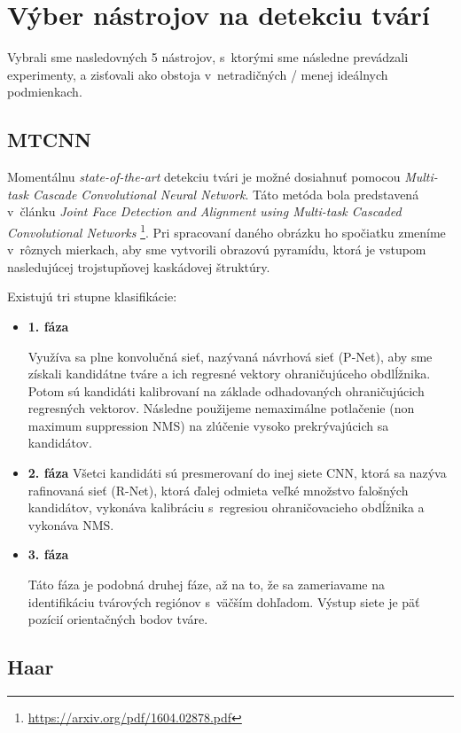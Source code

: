 \documentclass[]{article}
\begin{document}
	\section{Výber nástrojov na detekciu tvárí}
	
	Vybrali sme nasledovných 5 nástrojov, s~ktorými sme následne prevádzali experimenty, a zisťovali ako obstoja v~netradičných / menej ideálnych podmienkach.
	
	\subsection*{MTCNN}
	Momentálnu \textit{state-of-the-art} detekciu tvári je možné dosiahnuť pomocou \textit{Multi-task Cascade Convolutional Neural Network}. Táto metóda bola predstavená v~článku \textit{Joint Face Detection and Alignment using Multi-task Cascaded Convolutional Networks} \footnote{\url{https://arxiv.org/pdf/1604.02878.pdf}}. Pri spracovaní daného obrázku ho spočiatku zmeníme v~rôznych mierkach, aby sme vytvorili obrazovú pyramídu, ktorá je vstupom nasledujúcej trojstupňovej kaskádovej štruktúry. 
	
	\newpage
	\noindent Existujú tri stupne klasifikácie:
	
	\begin{itemize}
		\item \textbf{1. fáza}
		
		Využíva sa plne konvolučná sieť, nazývaná návrhová sieť (P-Net), aby sme získali kandidátne tváre a ich regresné vektory ohraničujúceho obdlĺžnika. Potom sú kandidáti kalibrovaní na základe odhadovaných ohraničujúcich regresných vektorov. Následne použijeme nemaximálne potlačenie (non maximum suppression NMS) na zlúčenie vysoko prekrývajúcich sa kandidátov.
		
		\item \textbf{2. fáza}
		Všetci kandidáti sú presmerovaní do inej siete CNN, ktorá sa nazýva rafinovaná sieť (R-Net), ktorá ďalej odmieta veľké množstvo falošných kandidátov, vykonáva kalibráciu s~regresiou ohraničovacieho obdĺžnika a vykonáva NMS.
		
		\item \textbf{3. fáza}
		
		Táto fáza je podobná druhej fáze, až na to, že sa zameriavame na identifikáciu tvárových regiónov s~väčším dohľadom. Výstup siete je päť pozícií orientačných bodov tváre.
	\end{itemize}

	\subsection*{Haar}
	
\end{document}
